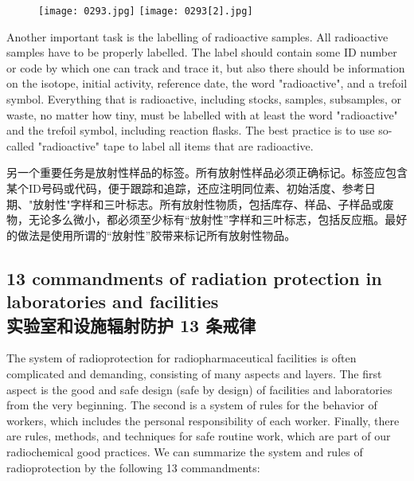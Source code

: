 \documentclass[dvipsnames, svgnames,a4paper,11pt]{article}
\begin{document}
\begin{figure}[h]
    \centering
    \texttt{[image: 0293.jpg]} \hspace{0.2in}
    \texttt{[image: 0293[2].jpg]}  
     \label{fig386}
\end{figure}

Another important task is the labelling of radioactive samples. All radioactive samples have to be properly labelled. The label should contain some ID number or code by which one can track and trace it, but also there should be information on the isotope, initial activity, reference date, the word "radioactive", and a trefoil symbol. Everything that is radioactive, including stocks, samples, subsamples, or waste, no matter how tiny, must be labelled with at least the word "radioactive" and the trefoil symbol, including reaction flasks. The best practice is to use so-called "radioactive" tape to label all items that are radioactive.

另一个重要任务是放射性样品的标签。所有放射性样品必须正确标记。标签应包含某个ID号码或代码，便于跟踪和追踪，还应注明同位素、初始活度、参考日期、"放射性"字样和三叶标志。所有放射性物质，包括库存、样品、子样品或废物，无论多么微小，都必须至少标有“放射性”字样和三叶标志，包括反应瓶。最好的做法是使用所谓的“放射性”胶带来标记所有放射性物品。

\subsection{13 commandments of radiation protection in laboratories and facilities\\ 实验室和设施辐射防护 13 条戒律}  
The system of radioprotection for radiopharmaceutical facilities is often complicated and demanding, consisting of many aspects and layers. The first aspect is the good and safe design (safe by design) of facilities and laboratories from the very beginning. The second is a system of rules for the behavior of workers, which includes the personal responsibility of each worker. Finally, there are rules, methods, and techniques for safe routine work, which are part of our radiochemical good practices. We can summarize the system and rules of radioprotection by the following 13 commandments:  
\end{document}
